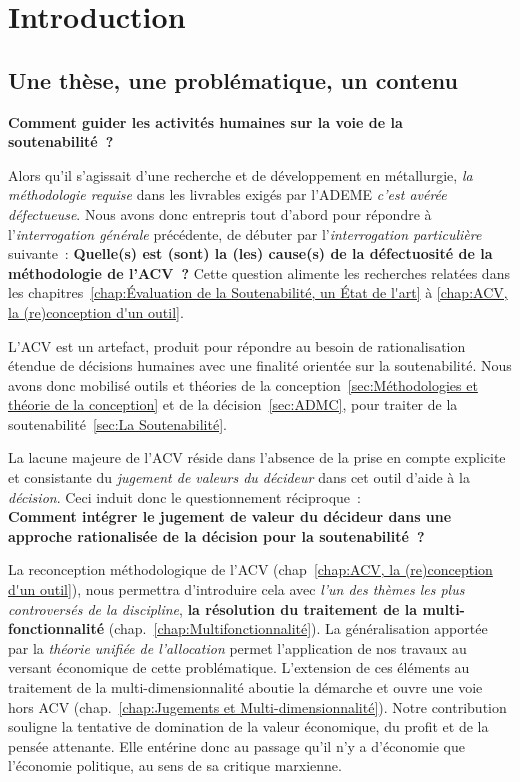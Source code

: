\chapter{Introduction}


\section{Une thèse, une problématique, un contenu}

\textbf{Comment guider les activités humaines sur la voie de la soutenabilité~?}

Alors qu'il s'agissait d'une recherche et de développement en métallurgie, \emph{la méthodologie requise} dans les livrables exigés par l'ADEME \emph{c'est avérée défectueuse}.
Nous avons donc entrepris tout d'abord pour répondre à l'\emph{interrogation générale} précédente, de débuter par l'\emph{interrogation particulière} suivante~:
\textbf{Quelle(s) est (sont) la (les) cause(s) de la défectuosité de la méthodologie de l'ACV~?}
Cette question alimente les recherches relatées dans les chapitres~\ref{chap:Évaluation de la Soutenabilité, un État de l'art} à \ref{chap:ACV, la (re)conception d'un outil}.

L'ACV est un artefact, produit pour répondre au besoin de rationalisation étendue de décisions humaines avec une finalité orientée sur la soutenabilité.
Nous avons donc mobilisé outils et théories de la conception~\ref{sec:Méthodologies et théorie de la conception} et de la décision~\ref{sec:ADMC}, pour traiter de la soutenabilité~\ref{sec:La Soutenabilité}.

La lacune majeure de l'ACV réside dans l'absence de la prise en compte explicite et consistante du \emph{jugement de valeurs du décideur} dans cet outil d'aide à la \emph{décision}.
Ceci induit donc le questionnement réciproque~:\\
\textbf{Comment intégrer le jugement de valeur du décideur dans une approche rationalisée de la décision pour la soutenabilité~?}

La reconception méthodologique de l'ACV (chap~\ref{chap:ACV, la (re)conception d'un outil}), nous permettra d'introduire cela avec \emph{l'un des thèmes les plus controversés de la discipline}, \textbf{la résolution du traitement de la multi-fonctionnalité} (chap.~\ref{chap:Multifonctionnalité}).
La généralisation apportée par la \emph{théorie unifiée de l'allocation} permet l'application de nos travaux au versant économique de cette problématique.
L’extension de ces éléments au traitement de la multi-dimensionnalité aboutie la démarche et ouvre une voie hors ACV (chap.~\ref{chap:Jugements et Multi-dimensionnalité}).
Notre contribution souligne la tentative de domination de la valeur économique, du profit et de la pensée attenante.
Elle entérine donc au passage qu'il n'y a d'économie que l'économie politique, au sens de sa critique marxienne.

